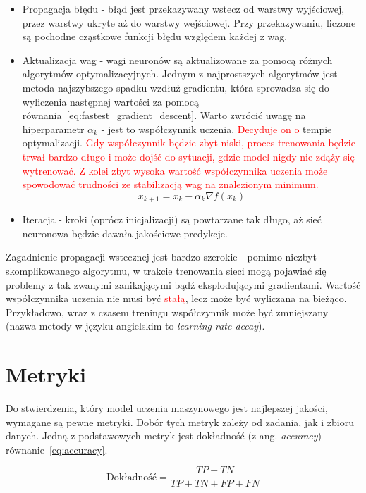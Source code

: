 \begin{itemize}
    \item Propagacja błędu - błąd jest przekazywany wstecz od warstwy wyjściowej, przez warstwy ukryte aż do warstwy wejściowej.
    Przy przekazywaniu, liczone są pochodne cząstkowe funkcji błędu względem każdej z wag.
    \item Aktualizacja wag - wagi neuronów są aktualizowane za pomocą różnych algorytmów optymalizacyjnych.
    Jednym z najprostszych algorytmów jest metoda najszybszego spadku wzdłuż gradientu, która sprowadza się do wyliczenia następnej wartości za pomocą równania~\ref{eq:fastest_gradient_descent}.
    Warto zwrócić uwagę na hiperparametr $\alpha_k$ - jest to współczynnik uczenia.
    \textcolor{red}{Decyduje on o} tempie optymalizacji.
    \textcolor{red}{Gdy współczynnik będzie zbyt niski, proces trenowania będzie trwał bardzo długo i może dojść do sytuacji, gdzie model nigdy nie zdąży się wytrenować.
    Z kolei zbyt wysoka wartość współczynnika uczenia może spowodować trudności ze stabilizacją wag na znalezionym minimum.}
    \begin{equation}
        x_{k+1} = x_k - \alpha_k \nabla f(x_k)\label{eq:fastest_gradient_descent}
    \end{equation}
    \item Iteracja - kroki (oprócz inicjalizacji) są powtarzane tak długo, aż sieć neuronowa będzie dawała jakościowe predykcje.
\end{itemize}

Zagadnienie propagacji wstecznej jest bardzo szerokie - pomimo niezbyt skomplikowanego algorytmu, w trakcie trenowania sieci mogą pojawiać się problemy z tak zwanymi zanikającymi bądź eksplodującymi gradientami.
Wartość współczynnika uczenia nie musi być \textcolor{red}{stałą}, lecz może być wyliczana na bieżąco.
Przykładowo, wraz z czasem treningu współczynnik może być zmniejszany (nazwa metody w języku angielskim to \textit{learning rate decay}).


\section{Metryki}

Do stwierdzenia, który model uczenia maszynowego jest najlepszej jakości, wymagane są pewne metryki.
Dobór tych metryk zależy od zadania, jak i zbioru danych.
Jedną z podstawowych metryk jest dokładność (z ang. \textit{accuracy}) - równanie~\ref{eq:accuracy}.

\begin{equation}
    \text{Dokładność} = \frac{TP + TN}{TP + TN + FP + FN}\label{eq:accuracy}
\end{equation}

